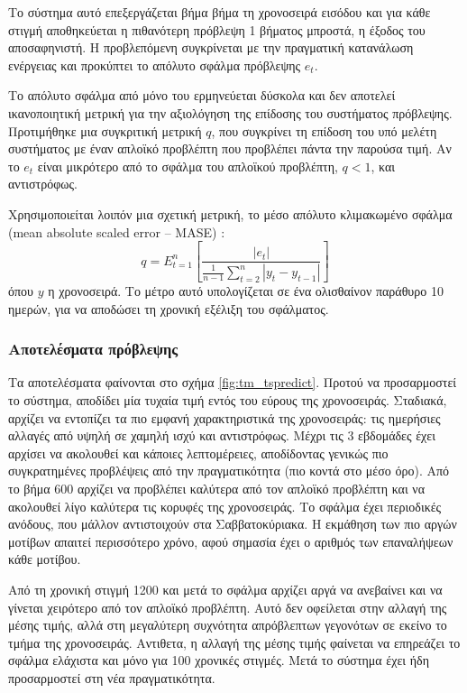 	Το σύστημα αυτό επεξεργάζεται βήμα βήμα τη χρονοσειρά εισόδου και για κάθε στιγμή αποθηκεύεται η πιθανότερη πρόβλεψη 1 βήματος μπροστά, η έξοδος του αποσαφηνιστή.
	Η προβλεπόμενη συγκρίνεται με την πραγματική κατανάλωση ενέργειας και προκύπτει το απόλυτο σφάλμα πρόβλεψης $e_t$.

	Το απόλυτο σφάλμα από μόνο του ερμηνεύεται δύσκολα και δεν αποτελεί ικανοποιητική μετρική για την αξιολόγηση της επίδοσης του συστήματος πρόβλεψης.
	Προτιμήθηκε μια συγκριτική μετρική $q$, που συγκρίνει τη επίδοση του υπό μελέτη συστήματος με έναν απλοϊκό προβλέπτη που προβλέπει πάντα την παρούσα τιμή.
	Αν το $e_t$ είναι μικρότερο από το σφάλμα του απλοϊκού προβλέπτη, $q<1$, και αντιστρόφως.

	Χρησιμοποιείται λοιπόν μια σχετική μετρική, το μέσο απόλυτο κλιμακωμένο σφάλμα (mean absolute scaled error -- MASE)
	\parencite{shcherbakovSurveyForecastError2013}:
	$$ q= E_{t=1}^n \left[ \frac{|e_t|}{\frac{1}{n-1} \sum_{t=2}^{n} |y_t - y_{t-1}|} \right] $$
	όπου $y$ η χρονοσειρά.
	Το μέτρο αυτό υπολογίζεται σε ένα ολισθαίνον παράθυρο 10 ημερών, για να αποδώσει τη χρονική εξέλιξη του σφάλματος.

	\subsubsection{Αποτελέσματα πρόβλεψης}

	Τα αποτελέσματα φαίνονται στο σχήμα \ref{fig:tm_tspredict}.
	Προτού να προσαρμοστεί το σύστημα, αποδίδει μία τυχαία τιμή εντός του εύρους της χρονοσειράς.
	Σταδιακά, αρχίζει να εντοπίζει τα πιο εμφανή χαρακτηριστικά της χρονοσειράς: τις ημερήσιες αλλαγές από υψηλή σε χαμηλή ισχύ και αντιστρόφως.
	Μέχρι τις 3 εβδομάδες έχει αρχίσει να ακολουθεί και κάποιες λεπτομέρειες, αποδίδοντας γενικώς πιο συγκρατημένες προβλέψεις από την πραγματικότητα (πιο κοντά στο μέσο όρο).
	Από το βήμα 600 αρχίζει να προβλέπει καλύτερα από τον απλοϊκό προβλέπτη και να ακολουθεί λίγο καλύτερα τις κορυφές της χρονοσειράς.
	Το σφάλμα έχει περιοδικές ανόδους, που μάλλον αντιστοιχούν στα Σαββατοκύριακα.
	Η εκμάθηση των πιο αργών μοτίβων απαιτεί περισσότερο χρόνο, αφού σημασία έχει ο αριθμός των επαναλήψεων κάθε μοτίβου.

	Από τη χρονική στιγμή 1200 και μετά το σφάλμα αρχίζει αργά να ανεβαίνει και να γίνεται χειρότερο από τον απλοϊκό προβλέπτη.
	Αυτό δεν οφείλεται στην αλλαγή της μέσης τιμής, αλλά στη μεγαλύτερη συχνότητα απρόβλεπτων γεγονότων σε εκείνο το τμήμα της χρονοσειράς.
	Αντιθετα, η αλλαγή της μέσης τιμής φαίνεται να επηρεάζει το σφάλμα ελάχιστα και μόνο για 100 χρονικές στιγμές.
	Μετά το σύστημα έχει ήδη προσαρμοστεί στη νέα πραγματικότητα.

